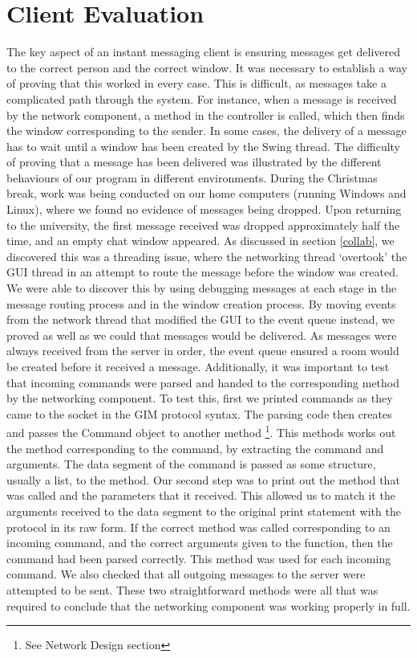 \section{Client Evaluation}
\label{client_eval}

The key aspect of an instant messaging client is ensuring messages get delivered to the correct person and the correct window. It was necessary to establish a way of proving that this worked in every case. This is difficult, as messages take a complicated path through the system. For instance, when a message is received by the network component, a method in the controller is called, which then finds the window corresponding to the sender. In some cases, the delivery of a message has to wait until a window has been created by the Swing thread. The difficulty of proving that a message has been delivered was illustrated by the different behaviours of our program in different environments. During the Christmas break, work was being conducted on our home computers (running Windows and Linux), where we found no evidence of messages being dropped. Upon returning to the university, the first message received was dropped approximately half the time, and an empty chat window appeared. As discussed in section \ref{collab}, we discovered this was a threading issue, where the networking thread `overtook' the GUI thread in an attempt to route the message before the window was created. We were able to discover this by using debugging messages at each stage in the message routing process and in the window creation process. By moving events from the network thread that modified the GUI to the event queue instead, we proved as well as we could that messages would be delivered. As messages were always received from the server in order, the event queue ensured a room would be created before it received a message. 
Additionally, it was important to test that incoming commands were parsed and handed to the corresponding method by the networking component. To test this, first we printed commands as they came to the socket in the GIM protocol syntax. The parsing code then creates and passes the Command object to another method \footnote{See Network Design section}. This methods works out the method corresponding to the command, by extracting the command and arguments. The data segment of the command is passed as some structure, usually a list, to the method. Our second step was to print out the method that was called and the parameters that it received. This allowed us to match it the arguments received to the data segment to the original print statement with the protocol in its raw form. If the correct method was called corresponding to an incoming command, and the correct arguments given to the function, then the command had been parsed correctly. This method was used for each incoming command. We also checked that all outgoing messages to the server were attempted to be sent. These two straightforward methods were all that was required to conclude that the networking component was working properly in full.

